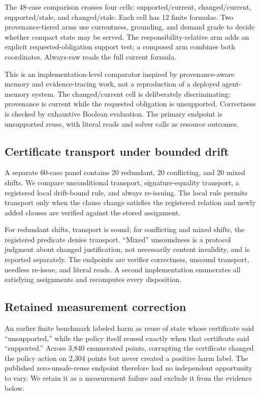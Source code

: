 \documentclass[10pt]{article}
\begin{document}
The 48-case comparison crosses four cells: supported/current, changed/current, supported/stale, and changed/stale. Each cell has 12 finite formulas. Two provenance-tiered arms use currentness, grounding, and demand grade to decide whether compact state may be served. The responsibility-relative arm adds an explicit requested-obligation support test; a composed arm combines both coordinates. Always-raw reads the full current formula.

This is an implementation-level comparator inspired by provenance-aware memory and evidence-tracing work, not a reproduction of a deployed agent-memory system. The changed/current cell is deliberately discriminating: provenance is current while the requested obligation is unsupported. Correctness is checked by exhaustive Boolean evaluation. The primary endpoint is unsupported reuse, with literal reads and solver calls as resource outcomes.

\subsection{Certificate transport under bounded drift}

A separate 60-case panel contains 20 redundant, 20 conflicting, and 20 mixed shifts. We compare unconditional transport, signature-equality transport, a registered local drift-bound rule, and always re-issuing. The local rule permits transport only when the clause change satisfies the registered relation and newly added clauses are verified against the stored assignment.

For redundant shifts, transport is sound; for conflicting and mixed shifts, the registered predicate denies transport. ``Mixed'' unsoundness is a protocol judgment about changed justification, not necessarily content invalidity, and is reported separately. The endpoints are verifier correctness, unsound transport, needless re-issue, and literal reads. A second implementation enumerates all satisfying assignments and recomputes every disposition.

\subsection{Retained measurement correction}

An earlier finite benchmark labeled harm as reuse of state whose certificate said ``unsupported,'' while the policy itself reused exactly when that certificate said ``supported.'' Across 3,840 enumerated points, corrupting the certificate changed the policy action on 2,304 points but never created a positive harm label. The published zero-unsafe-reuse endpoint therefore had no independent opportunity to vary. We retain it as a measurement failure and exclude it from the evidence below.
\end{document}
